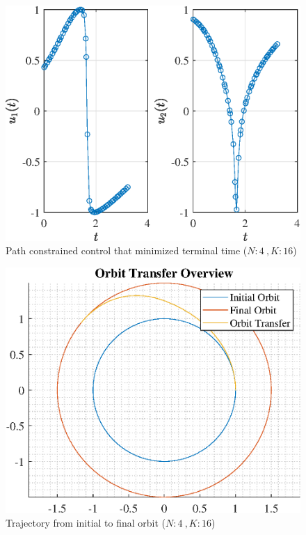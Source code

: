 \documentclass[]{article}
\begin{document}
\begin{figure}
	\centering
	\includegraphics[scale=0.75]{path_N4_K16_C3_tf.eps}
	\caption{Path constrained control that minimized terminal time (\(N:4\ , K:16\))}
	\label{fig:path_N4_K16_C3_tf}
\end{figure}
\begin{figure}
	\centering
	\includegraphics[scale=0.75]{orbit_N4_K16_C3_tf.eps}
	\caption{Trajectory from initial to final orbit (\(N:4\ , K:16\))}
	\label{fig:orbit_N4_K16_C3_tf}
\end{figure}
\end{document}
